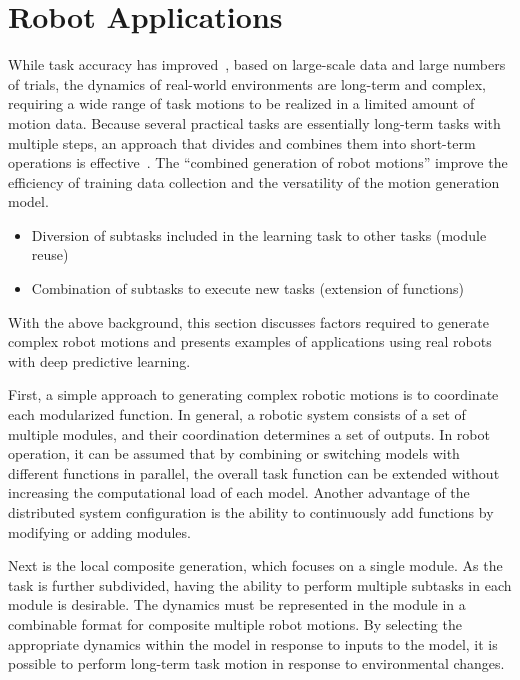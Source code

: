 \section{Robot Applications}
\label{sec_case_studies}

While task accuracy has improved~\cite{Levine2017ijrr, Andrychowicz2020ijrr}, based on large-scale data and large numbers of trials, the dynamics of real-world environments are long-term and complex, requiring a wide range of task motions to be realized in a limited amount of motion data.
Because several practical tasks are essentially long-term tasks with multiple steps, an approach that divides and combines them into short-term operations is effective~\cite{Sacerdoti1974ai,Wolpert1998,Schaal2003isrr}.
The ``combined generation of robot motions'' improve the efficiency of training data collection and the versatility of the motion generation model.
\begin{itemize}
    \item Diversion of subtasks included in the learning task to other tasks (module reuse)
    \item Combination of subtasks to execute new tasks (extension of functions)
\end{itemize}

With the above background, this section discusses factors required to generate complex robot motions and presents examples of applications using real robots with deep predictive learning.

First, a simple approach to generating complex robotic motions is to coordinate each modularized function. In general, a robotic system consists of a set of multiple modules, and their coordination determines a set of outputs. In robot operation, it can be assumed that by combining or switching models with different functions in parallel, the overall task function can be extended without increasing the computational load of each model. Another advantage of the distributed system configuration is the ability to continuously add functions by modifying or adding modules.

Next is the local composite generation, which focuses on a single module. As the task is further subdivided, having the ability to perform multiple subtasks in each module is desirable. The dynamics must be represented in the module in a combinable format for composite multiple robot motions. By selecting the appropriate dynamics within the model in response to inputs to the model, it is possible to perform long-term task motion in response to environmental changes.

